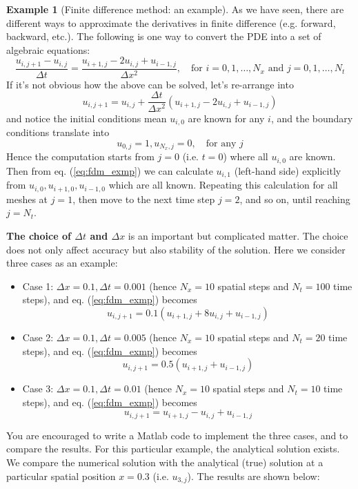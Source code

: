 \documentclass[a4paper,11pt]{article}
\theoremstyle{definition}
\newtheorem{exmp}{Example}[section]
\begin{document}
\begin{exmp}[Finite difference method: an example]
As we have seen, there are different ways to approximate the derivatives
in finite difference (e.g. forward, backward, etc.). The following is one way to convert 
the PDE into a set of algebraic equations:
\[
	\frac{u_{i, j+1} - u_{i, j}}{\Delta t} = \frac{u_{i+1, j} - 2 u_{i, j} + u_{i-1, j}}{\Delta x^2}, \quad \textrm{for }
	i=0, 1, \ldots, N_x \textrm{ and }  j=0, 1, \ldots, N_t
\]
If it's not obvious how the above can be solved, let's re-arrange into
\begin{equation} \label{eq:fdm_exmp}
	u_{i, j+1} = u_{i, j} + \frac{\Delta t}{\Delta x^2} \left( u_{i+1, j} - 2 u_{i, j} + u_{i-1, j} \right)
\end{equation}
and notice the initial conditions mean $u_{i, 0}$ are known for any $i$,
and the boundary conditions translate into
\[
	u_{0,j} = 1, u_{N_x, j} = 0, \quad \textrm{for any } j
\]
Hence the computation starts from $j=0$ (i.e. $t=0$) where all $u_{i,0}$ are known. Then from
eq. (\ref{eq:fdm_exmp}) we can calculate $u_{i,1}$ (left-hand side) explicitly from
$u_{i,0}, u_{i+1,0}, u_{i-1,0}$ which are all known. Repeating this calculation for all meshes at $j=1$,
then move to the next time step $j=2$, and so on, until reaching $j=N_t$.

\textbf{The choice of $\Delta t$ and $\Delta x$} is an important but complicated matter.
The choice does not only affect accuracy but also stability of the solution. Here we consider three cases
as an example:
\begin{itemize}
	\item Case 1: $\Delta x=0.1, \Delta t=0.001$ (hence $N_x=10$ spatial steps and $N_t=100$ time steps), 
		and eq. (\ref{eq:fdm_exmp}) becomes
		\[ u_{i, j+1} = 0.1 \left( u_{i+1, j} + 8 u_{i, j} + u_{i-1, j} \right) \]
	\item Case 2: $\Delta x=0.1, \Delta t=0.005$ (hence $N_x=10$ spatial steps and $N_t=20$ time steps), 
		and eq. (\ref{eq:fdm_exmp}) becomes
		\[ u_{i, j+1} = 0.5 \left( u_{i+1, j} + u_{i-1, j} \right) \]
	\item Case 3: $\Delta x=0.1, \Delta t=0.01$ (hence $N_x=10$ spatial steps and $N_t=10$ time steps), 
		and eq. (\ref{eq:fdm_exmp}) becomes
		\[ u_{i, j+1} = u_{i+1, j} - u_{i, j} + u_{i-1, j} \]
\end{itemize}
You are encouraged to write a Matlab code to implement the three cases, and to compare the results.
For this particular example, the analytical solution exists. We compare the numerical solution with the analytical (true) solution
at a particular spatial position $x=0.3$ (i.e. $u_{3, j}$). The results are shown below:


\end{exmp}
\end{document}
